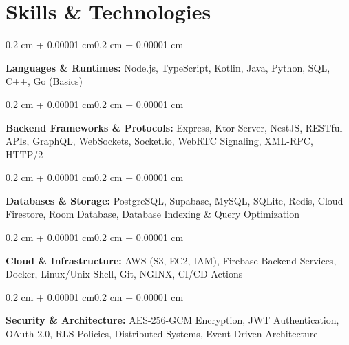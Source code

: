\documentclass[10pt, a4paper]{article}
\newenvironment{onecolentry}{
    \begin{adjustwidth}{0.2 cm + 0.00001 cm}{0.2 cm + 0.00001 cm}
}{
    \end{adjustwidth}
}
\begin{document}
\section{Skills \& Technologies}
\begin{onecolentry}
\textbf{Languages \& Runtimes:} Node.js, TypeScript, Kotlin, Java, Python, SQL, C++, Go (Basics)
\end{onecolentry}
\vspace{0.10 cm}
\begin{onecolentry}
\textbf{Backend Frameworks \& Protocols:} Express, Ktor Server, NestJS, RESTful APIs, GraphQL, WebSockets, Socket.io, WebRTC Signaling, XML-RPC, HTTP/2
\end{onecolentry}
\vspace{0.10 cm}
\begin{onecolentry}
\textbf{Databases \& Storage:} PostgreSQL, Supabase, MySQL, SQLite, Redis, Cloud Firestore, Room Database, Database Indexing \& Query Optimization
\end{onecolentry}
\vspace{0.10 cm}
\begin{onecolentry}
\textbf{Cloud \& Infrastructure:} AWS (S3, EC2, IAM), Firebase Backend Services, Docker, Linux/Unix Shell, Git, NGINX, CI/CD Actions
\end{onecolentry}
\vspace{0.10 cm}
\begin{onecolentry}
\textbf{Security \& Architecture:} AES-256-GCM Encryption, JWT Authentication, OAuth 2.0, RLS Policies, Distributed Systems, Event-Driven Architecture
\end{onecolentry}
\end{document}
